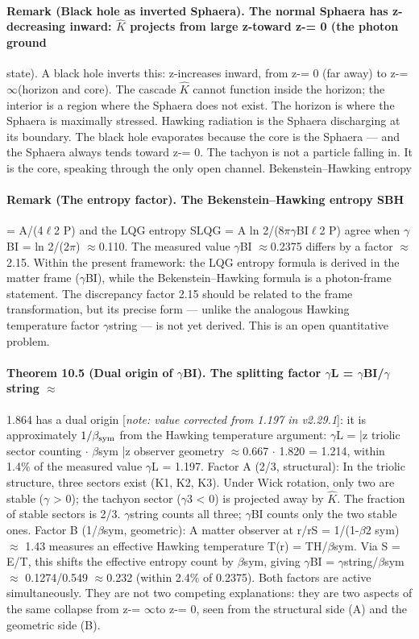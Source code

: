\paragraph*{Remark (Black hole as inverted Sphaera). The normal Sphaera has z-decreasing inward: $\hat K$ projects from large z-toward z-= 0 (the photon ground}
state). A black hole inverts this: z-increases inward, from z-= 0 (far away) to z-= $\infty$(horizon and core). The cascade $\hat K$ cannot function inside the horizon; the interior is a region where the Sphaera does not exist. The horizon is where the Sphaera is maximally stressed. Hawking radiation is the Sphaera discharging at its boundary. The black hole evaporates because the core is the Sphaera --- and the Sphaera always tends toward z-= 0. The tachyon is not a particle falling in. It is the core, speaking through the only open channel. Bekenstein--Hawking entropy
\paragraph*{Remark (The entropy factor). The Bekenstein--Hawking entropy SBH}
= A/(4$\ell$2 P) and the LQG entropy SLQG = A ln 2/(8$\pi$$\gamma$BI$\ell$2 P) agree when $\gamma$BI = ln 2/(2$\pi$) $\approx$0.110. The measured value $\gamma$BI $\approx$0.2375 differs by a factor $\approx$2.15. Within the present framework: the LQG entropy formula is derived in the matter frame ($\gamma$BI), while the Bekenstein--Hawking formula is a photon-frame statement. The discrepancy factor 2.15 should be related to the frame transformation, but its precise form --- unlike the analogous Hawking temperature factor $\gamma$string --- is not yet derived. This is an open quantitative problem.
\paragraph*{Theorem 10.5 (Dual origin of $\gamma$BI). The splitting factor $\gamma$L = $\gamma$BI/$\gamma$string $\approx$}
1.864 has a dual origin [\emph{note: value corrected from 1.197 in v2.29.1}]: it is approximately $1/\beta_{\mathrm{sym}}$ from the Hawking temperature argument:
$\gamma$L = |{z} triolic sector counting $\cdot$ $\beta$sym |{z} observer geometry $\approx$0.667 $\cdot$ 1.820 = 1.214, within 1.4\% of the measured value $\gamma$L = 1.197. Factor A (2/3, structural): In the triolic structure, three sectors exist (K1, K2, K3). Under Wick rotation, only two are stable ($\gamma$ > 0); the tachyon sector ($\gamma$3 < 0) is projected away by $\hat K$. The fraction of stable sectors is 2/3. $\gamma$string counts all three; $\gamma$BI counts only the two stable ones. Factor B (1/$\beta$sym, geometric): A matter observer at r/rS = 1/(1-$\beta$2 sym) $\approx$
1.43 measures an effective Hawking temperature T(r) = TH/$\beta$sym. Via S =
E/T, this shifts the effective entropy count by $\beta$sym, giving $\gamma$BI = $\gamma$string/$\beta$sym $\approx$
0.1274/0.549 $\approx$0.232 (within 2.4\% of 0.2375).
Both factors are active simultaneously. They are not two competing explanations: they are two aspects of the same collapse from z-= $\infty$to z-= 0, seen from the structural side (A) and the geometric side (B).
